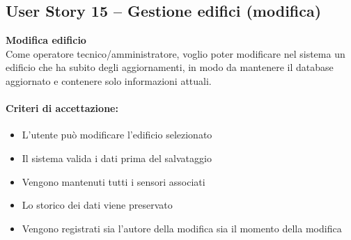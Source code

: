 \subsection{User Story 15 – Gestione edifici (modifica)}
\label{us:modificaEdificio}

\textbf{Modifica edificio} \\
Come operatore tecnico/amministratore, voglio poter modificare nel sistema un edificio che ha subito degli aggiornamenti, in modo da mantenere il database aggiornato e contenere solo informazioni attuali.

\paragraph*{Criteri di accettazione:}
\begin{itemize}
    \item L'utente può modificare l'edificio selezionato
    \item Il sistema valida i dati prima del salvataggio
    \item Vengono mantenuti tutti i sensori associati
    \item Lo storico dei dati viene preservato
    \item Vengono registrati sia l'autore della modifica sia il momento della modifica 
\end{itemize}

